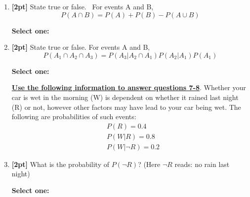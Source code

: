 \documentclass[12pt]{article}
\renewcommand{\circle}{\tikz\draw[black] (0,0) circle (1ex);}
\begin{document}
\begin{enumerate}
    \begin{tcolorbox}[fit,height=1cm, width=2cm, blank, borderline={1pt}{-2pt},nobeforeafter]
    \end{tcolorbox}


    \item \textbf{[2pt]} State true or false.  For events A and B, $$ P(A \cap B) = P(A) + P(B) - P(A \cup B)$$

    \textbf{Select one:}


    \item \textbf{[2pt]} State true or false. For events A and B, $$P(A_1\cap A_2 \cap A_3) = P(A_3|A_2\cap A_1)P(A_2|A_1)P(A_1)$$

    \textbf{Select one:}

    
    
    \bigskip\bigskip\bigskip
    \textbf{\underline{Use the following information to answer questions 7-8}}. Whether your car is wet in the morning (W) is dependent on whether it rained last night (R) or not, however other factors may have lead to your car being wet. The following are probabilities of such events:
    \begin{eqnarray*}
        & P(R) = 0.4\\
        & P(W | R) = 0.8\\
        & P(W | \neg R ) = 0.2
    \end{eqnarray*}
    
\clearpage
    \item \textbf{[2pt]} What is the probability of $P(\neg R)$?
(Here $ \neg R$ reads: no rain last night)

    \textbf{Select one:}



\end{enumerate}
\end{document}
